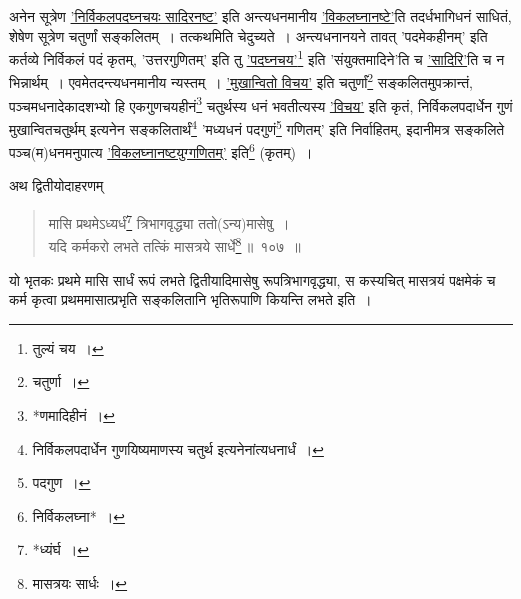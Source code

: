 \documentclass[10pt, openany]{book}
\begin{document}
{{{{{{{\newpage

{अनेन सूत्रेण \hyperref[89]{'निर्विकलपदघ्नचयः सादिरनष्ट'} इति अन्त्यधनमानीय
\hyperref[89]{'विकलघ्नानष्टे'}ति}
{तदर्धभागिधनं साधितं, शेषेण सूत्रेण चतुर्णां सङ्कलितम्~। तत्कथमिति
चेदुच्यते~। अन्त्यधनानयने}
{तावत् {\qt 'पदमेकहीनम्'} इति कर्तव्ये निर्विकलं पदं कृतम्, {\qt 'उत्तरगुणितम्'} इति तु
\hyperref[89]{'पदघ्नचय'}\renewcommand{\thefootnote}{१}\footnote{तुल्यं चय~।}  इति}
{{\qt 'संयुक्तमादिने'}ति च \hyperref[89]{'सादिरि'}ति च न भिन्नार्थम्~। एवमेतदन्त्यधनमानीय
न्यस्तम्~। \hyperref[89]{'मुखान्वितो विचय'} इति चतुर्णां\renewcommand{\thefootnote}{२}\footnote{चतुर्णा~।}  सङ्कलितमुपक्रान्तं, पञ्चमधनादेकादशभ्यो हि
एकगुणचयहीनं\renewcommand{\thefootnote}{३}\footnote{*णमादिहीनं~।}  चतुर्थस्य}
{धनं भवतीत्यस्य \hyperref[89]{'विचय'} इति कृतं, निर्विकलपदार्धेन गुणं मुखान्वितचतुर्थम्
इत्यनेन सङ्कलितार्थं\renewcommand{\thefootnote}{४}\footnote{निर्विकलपदार्धेन गुणयिष्यमाणस्य चतुर्थ इत्यनेनांत्यधनार्धं~।} {\qt 'मध्यधनं पदगुणं\renewcommand{\thefootnote}{५}\footnote{पदगुण~।}   गणितम्'} इति निर्वाहितम्, इदानीमत्र
सङ्कलिते पञ्च(म)धनमनुपात्य \hyperref[89]{'विकलघ्नानष्टयुग्गणितम्'} इति\renewcommand{\thefootnote}{६}\footnote{निर्विकलघ्ना*~।} (कृतम्)~।}
\vspace{3mm}

 {अथ द्वितीयोदाहरणम्\textendash}

\begin{quote}
    
{\eg मासि प्रथमेऽध्यर्धं\renewcommand{\thefootnote}{७}\footnote{*ध्यंर्घ~।}  त्रिभागवृद्ध्या ततो(ऽन्य)मासेषु~।\\
 यदि कर्मकरो लभते तत्किं मासत्रये सार्धे\renewcommand{\thefootnote}{८}\footnote{मासत्रयः सार्धः~।}\,॥~१०७~॥}\end{quote}

{यो भृतकः प्रथमे मासि सार्धं रूपं लभते द्वितीयादिमासेषु
रूपत्रिभागवृद्ध्या,}
{स कस्यचित् मासत्रयं पक्षमेकं च कर्म कृत्वा प्रथममासात्प्रभृति सङ्कलितानि
भृतिरूपाणि}
{कियन्ति लभते इति~।}
\vspace{2mm}

}}}}}}}
\end{document}
